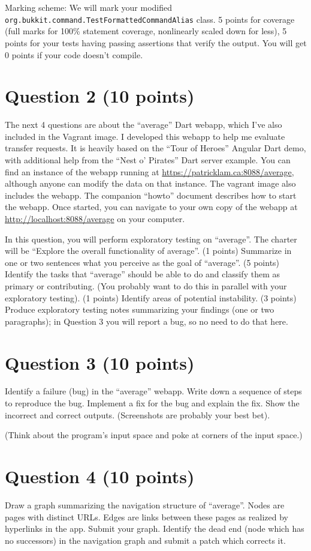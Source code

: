 \documentclass[10pt]{article}
\begin{document}
Marking scheme: We will mark your modified {\tt
  org.bukkit.command.TestFormattedCommandAlias} class.  5 points for
coverage (full marks for 100\% statement coverage, nonlinearly scaled
down for less), 5 points for your tests having passing assertions that
verify the output. You will get 0 points if your code doesn't compile.

\section*{Question 2 (10 points)} 
The next 4 questions are about the ``average'' Dart webapp, which I've
also included in the Vagrant image. I developed this webapp to help me
evaluate transfer requests. It is heavily based on the ``Tour of
Heroes'' Angular Dart demo, with additional help from the ``Nest o' Pirates'' 
Dart server example. You can find an instance of the webapp
running at \url{https://patricklam.ca:8088/average}, although anyone
can modify the data on that instance. The vagrant image also includes
the webapp. The companion ``howto'' document describes how to start
the webapp. Once started, you can navigate to your own copy of the
webapp at \url{http://localhost:8088/average} on your computer.

In this question, you will perform exploratory testing on ``average''.
The charter will be ``Explore the overall functionality of
average''. (1 points) Summarize in one or two sentences what you
perceive as the goal of ``average''. (5 points) Identify the tasks
that ``average'' should be able to do and classify them as primary or
contributing. (You probably want to do this in parallel with your
exploratory testing). (1 points) Identify areas of potential
instability. (3 points) Produce exploratory testing notes summarizing
your findings (one or two paragraphs); in Question 3 you will report a
bug, so no need to do that here.

\section*{Question 3 (10 points)}
Identify a failure (bug) in the ``average'' webapp. Write down a sequence of
steps to reproduce the bug. Implement a fix for the bug and explain the
fix. Show the incorrect and correct outputs. (Screenshots are probably
your best bet).

(Think about the program's input space and poke at corners of the
input space.)

\section*{Question 4 (10 points)}
Draw a graph summarizing the navigation structure of ``average''.
Nodes are pages with distinct URLs. Edges are links between these
pages as realized by hyperlinks in the app. Submit your graph.
Identify the dead end (node which has no successors) in the navigation
graph and submit a patch which corrects it.
\end{document}
